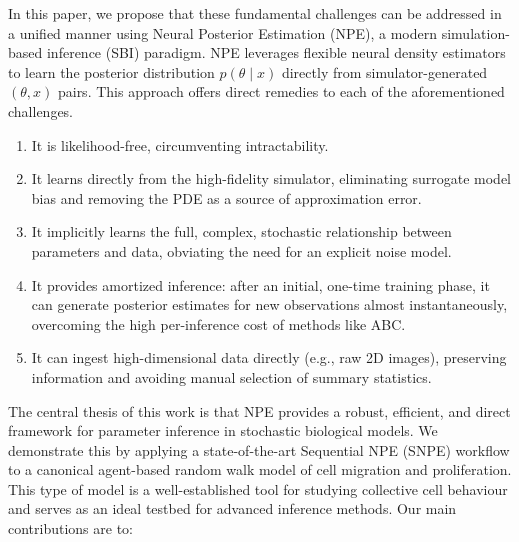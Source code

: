 \documentclass{article}
\begin{document}
In this paper, we propose that these fundamental challenges can be addressed in a unified manner using Neural Posterior Estimation (NPE), a modern simulation-based inference (SBI) paradigm. NPE leverages flexible neural density estimators to learn the posterior distribution $p\left(\theta \mid x\right)$ directly from simulator-generated $(\theta,x)$ pairs. This approach offers direct remedies to each of the aforementioned challenges. 
\begin{enumerate} 
	\item It is likelihood-free, circumventing intractability.
	 \item It learns directly from the high-fidelity simulator, eliminating surrogate model bias and removing the PDE as a source of approximation error. 
	 \item It implicitly learns the full, complex, stochastic relationship between parameters and data, obviating the need for an explicit noise model. 
	 \item It provides amortized inference: after an initial, one-time training phase, it can generate posterior estimates for new observations almost instantaneously, overcoming the high per-inference cost of methods like ABC. 
	 \item It can ingest high-dimensional data directly (e.g., raw 2D images), preserving information and avoiding manual selection of summary statistics.
	 \end{enumerate}
The central thesis of this work is that NPE provides a robust, efficient, and direct framework for parameter inference in stochastic biological models. We demonstrate this by applying a state-of-the-art Sequential NPE (SNPE) workflow to a canonical agent-based random walk model of cell migration and proliferation. This type of model is a well-established tool for studying collective cell behaviour \citep[see e.g.][]{Simpson2025.05.25.656057} and serves as an ideal testbed for advanced inference methods. Our main contributions are to:
\end{document}

